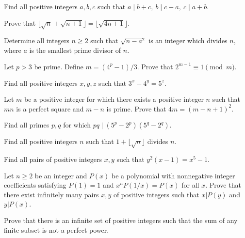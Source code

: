 \begin{problem}{\label{p:n:n:pr:35}}
  Find all positive integers $a,b,c$ such that $a\mid b+c,\ b\mid c+a,\
    c\mid a+b$.
\end{problem}
\begin{problem}{\label{p:n:n:pr:36}}
  Prove that $\lfloor\sqrt n+\sqrt{n+1}\rfloor=\lfloor\sqrt{4n+1}\rfloor$.
\end{problem}
\begin{problem}{\label{p:n:n:pr:37}}
  Determine all integers $n \geq 2$ such that $\sqrt{n-a^2}$ is an integer
    which divides $n$, where $a$ is the smallest prime divisor of $n$.
\end{problem}
\begin{problem}{\label{p:n:n:pr:38}}
    Let $p>3$ be prime. Define $m=(4^p-1)/3$. Prove that $2^{m-1}\equiv
    1\pmod m$.
\end{problem}
\begin{problem}{\label{p:n:n:pr:39}}
  Find all positive integers $x,y,z$ such that $3^x+4^y=5^z$.
\end{problem}
\begin{problem}{\label{p:n:n:pr:40}}
  Let $m$ be a positive integer for which there exists a positive integer
    $n$ such that $mn$ is a perfect square and $m-n$ is
    prime. Prove that $4m=(m-n+1)^2$.
\end{problem}
\begin{problem}{\label{p:n:n:pr:41}}
  Find all primes $p,q$ for which $pq\mid (5^p-2^p)(5^q-2^q)$.
\end{problem}
\begin{problem}{\label{p:n:n:pr:42}}
  Find all positive integers $n$ such that $1+\lfloor\sqrt n\rfloor$
    divides $n$.
\end{problem}
\begin{problem}{\label{p:n:n:pr:43}}
  Find all pairs of positive integers $x,y$ such that $y^2(x-1)=x^5-1$.
\end{problem}
\begin{problem}{\label{p:n:n:pr:44}}
  Let $n\ge 2$ be an integer and
    $P(x)$ be a polynomial with nonnegative integer coefficients satisfying
    $P(1)=1$ and $x^n P(1/x)=P(x)$ for all $x$.
    Prove that there exist infinitely many
    pairs $x, y$ of positive integers such that $x|P(y)$ and $y|P(x)$.
\end{problem}
\begin{problem}{\label{p:n:n:pr:45}}
  Prove that there is an infinite set of positive integers such that the
    sum of any finite subset is not a perfect power.
\end{problem}
